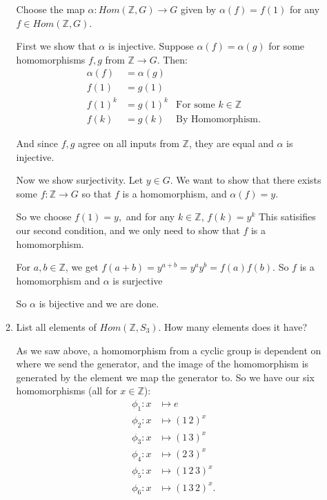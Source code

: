 \documentclass{article}
\begin{document}
\begin{enumerate}
\begin{enumerate}[label= (\alph*)]
            Choose the map $\alpha:Hom(\mathbb{Z},G)\to G$ given by 
            $\alpha (f)=f(1)$ for any $f \in  Hom(\mathbb{Z},G)$.

            First we show that $\alpha$ is injective. Suppose $\alpha(f)=\alpha(g)$ for some
            homomorphisms $f,g$ from $\mathbb{Z}\to G$. Then:
            \begin{align*}
                \alpha(f)&=\alpha(g)\\
                f(1)&= g(1) \\
                f(1)^{k}&= g(1)^{k} &\text{For some }k\in \mathbb{Z}\\
                f(k)&=g(k) &\text{By Homomorphism}
            .\end{align*}

            And since $f, g$ agree on all inputs from $\mathbb{Z}$, they are equal and
            $\alpha$ is injective.

            Now we show surjectivity. Let $y\in G$. We want to show that there exists some 
            $f:\mathbb{Z}\to G$ so that $f$ is a homomorphism, and $\alpha(f)=y$.

            So we choose $f(1)=y,$ and for any $k\in \mathbb{Z}$, $f(k)=y^{k}$ This satisifies our
            second condition, and we only need to show that 
            $f$ is a homomorphism.

            For $a,b\in \mathbb{Z}$, we get $f(a+b)=y^{a+b}=y^{a}y^{b}=f(a)f(b)$. So $f$ is a 
            homomorphism and $\alpha$ is surjective

            So $\alpha$ is bijective and we are done.
            
        \item List all elements of $Hom(\mathbb{Z}, S_3)$. How many elements does it have?

            As we saw above, a homomorphism from a cyclic group is dependent on where we send
            the generator, and the image of the homomorphism is generated by the element we map
            the generator to. So we have our six homomorphisms (all for $x\in \mathbb{Z}$):
            \begin{align*}
                \phi_1: x&\mapsto e\\
                \phi_2: x&\mapsto (1\,2)^{x}\\
                \phi_3: x&\mapsto (1\,3)^{x}\\
                \phi_4: x&\mapsto (2\,3)^{x}\\
                \phi_5: x&\mapsto (1\,2\,3)^{x}\\
                \phi_6: x&\mapsto (1\,3\,2)^{x}
            .\end{align*}
    \end{enumerate}


\end{enumerate}
\end{document}
